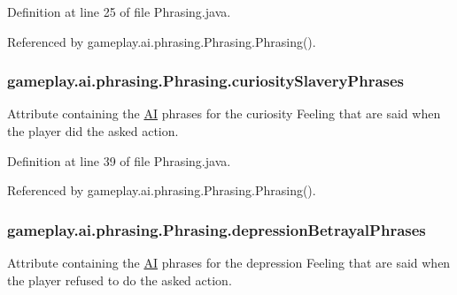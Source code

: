 Definition at line 25 of file Phrasing.\-java.



Referenced by gameplay.\-ai.\-phrasing.\-Phrasing.\-Phrasing().

\hypertarget{a00018_a2e35ff33685cec980af1454e7f255d06}{
\subsubsection[{curiosity\-Slavery\-Phrases}]{ gameplay.\-ai.\-phrasing.\-Phrasing.\-curiosity\-Slavery\-Phrases\hspace{0.3cm}{\ttfamily [protected]}}}\label{a00018_a2e35ff33685cec980af1454e7f255d06}


Attribute containing the \hyperlink{a00001}{A\-I} phrases for the curiosity Feeling that are said when the player did the asked action. 



Definition at line 39 of file Phrasing.\-java.



Referenced by gameplay.\-ai.\-phrasing.\-Phrasing.\-Phrasing().

\hypertarget{a00018_a1ab28780f3cb894c496ebd26185493aa}{
\subsubsection[{depression\-Betrayal\-Phrases}]{ gameplay.\-ai.\-phrasing.\-Phrasing.\-depression\-Betrayal\-Phrases\hspace{0.3cm}{\ttfamily [protected]}}}\label{a00018_a1ab28780f3cb894c496ebd26185493aa}


Attribute containing the \hyperlink{a00001}{A\-I} phrases for the depression Feeling that are said when the player refused to do the asked action. 



